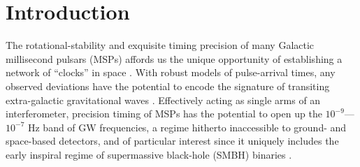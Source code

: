 \documentclass[prd,showpacs,nofootinbib]{revtex4}
\begin{document}
\begin{abstract}
\end{abstract}

\pacs{}

\maketitle


\section{Introduction}

The rotational-stability and exquisite timing precision of many Galactic millisecond pulsars (MSPs) affords us
the unique opportunity of establishing a network of ``clocks'' in space \citep{foster-backer-1990}. With robust models of
pulse-arrival times, any observed deviations have the potential to encode the signature of 
transiting extra-galactic gravitational waves \citep{estabrook-1975,burke-1975,sazhin-1978,detweiler-1979}. Effectively acting as single arms 
of an interferometer, precision timing of MSPs has the potential to open up the $10^{-9}$---$10^{-7}$ Hz band of 
GW frequencies, a regime hitherto inaccessible to ground- and space-based detectors, and of particular interest
since it uniquely includes the early inspiral regime of supermassive black-hole (SMBH) binaries \citep{sesana2008}.
\end{document}
